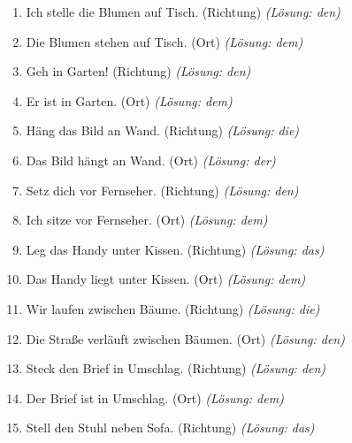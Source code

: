 \begin{enumerate}
    \item Ich stelle die Blumen auf \underline{\hspace{1cm}} Tisch. (Richtung) \quad \textit{(Lösung: den)}
    \item Die Blumen stehen auf \underline{\hspace{1cm}} Tisch. (Ort) \quad \textit{(Lösung: dem)}
    \item Geh in \underline{\hspace{1cm}} Garten! (Richtung) \quad \textit{(Lösung: den)}
    \item Er ist in \underline{\hspace{1cm}} Garten. (Ort) \quad \textit{(Lösung: dem)}
    \item Häng das Bild an \underline{\hspace{1cm}} Wand. (Richtung) \quad \textit{(Lösung: die)}
    \item Das Bild hängt an \underline{\hspace{1cm}} Wand. (Ort) \quad \textit{(Lösung: der)}
    \item Setz dich vor \underline{\hspace{1cm}} Fernseher. (Richtung) \quad \textit{(Lösung: den)}
    \item Ich sitze vor \underline{\hspace{1cm}} Fernseher. (Ort) \quad \textit{(Lösung: dem)}
    \item Leg das Handy unter \underline{\hspace{1cm}} Kissen. (Richtung) \quad \textit{(Lösung: das)}
    \item Das Handy liegt unter \underline{\hspace{1cm}} Kissen. (Ort) \quad \textit{(Lösung: dem)}
    \item Wir laufen zwischen \underline{\hspace{1cm}} Bäume. (Richtung) \quad \textit{(Lösung: die)}
    \item Die Straße verläuft zwischen \underline{\hspace{1cm}} Bäumen. (Ort) \quad \textit{(Lösung: den)}
    \item Steck den Brief in \underline{\hspace{1cm}} Umschlag. (Richtung) \quad \textit{(Lösung: den)}
    \item Der Brief ist in \underline{\hspace{1cm}} Umschlag. (Ort) \quad \textit{(Lösung: dem)}
    \item Stell den Stuhl neben \underline{\hspace{1cm}} Sofa. (Richtung) \quad \textit{(Lösung: das)}

\end{enumerate}
